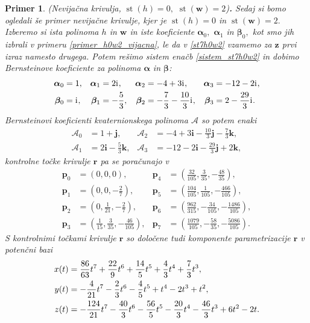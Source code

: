\documentclass[12pt,a4paper,twoside]{article}
\newcommand{\iu}{\mathrm{i}\mkern1mu} %
\theoremstyle{definition} %
\theoremstyle{plain} %
\theoremstyle{primerstyle}
\newtheorem{primer}[definicija]{Primer}
\numberwithin{equation}{section}  %
\newcommand{\pV}{\mathbf{p}}
\newcommand{\rV}{\mathbf{r}}
\newcommand{\iV}{\mathbf{i}}
\newcommand{\jV}{\mathbf{j}}
\newcommand{\kV}{\mathbf{k}}
\newcommand{\wV}{\mathbf{w}}
\newcommand{\zV}{\mathbf{z}}
\newcommand{\AQ}{\mathcal{A}}
\newcommand{\balpha}{\boldsymbol \alpha}
\newcommand{\bbeta}{\boldsymbol \beta}
\DeclareMathOperator{\st}{st}
\begin{document}
\begin{primer}
	\label{primer_h0w2_nevijacna}
	\textnormal{ }(Nevijačna krivulja, $\st(h)=0,$ $\st(\wV)=2$)\textbf{.}
	Sedaj si bomo ogledali še primer nevijačne krivulje, kjer je $\st(h)=0$ in $\st(\wV)=2.$ Izberemo si ista polinoma $h$ in $\wV$ in iste koeficiente $\balpha_0,$ $\balpha_1$ in $\bbeta_0,$ kot smo jih izbrali v primeru \ref{primer_h0w2_vijacna}, le da v \eqref{st7h0w2} vzamemo za $\zV$ prvi izraz namesto drugega. Potem rešimo sistem enačb \eqref{sistem_st7h0w2} in dobimo Bernsteinove koeficiente za polinoma $\balpha$ in $\bbeta$:
	\begin{align*}
		\balpha_0&=1,&\balpha_1&=2\iu,&\balpha_2&=-4+3\iu,&\balpha_3&=-12-2\iu,\\
		\bbeta_0&=\iu,&\bbeta_1&=-\frac{5}{3},&\bbeta_2&=-\frac{7}{3}-\frac{10}{3}\iu,&\bbeta_3&=2-\frac{29}{3}\iu.
	\end{align*}
	Bernsteinovi koeficienti kvaternionskega polinoma $\AQ$ so potem enaki
	\begin{align*}
		\AQ_0&=1+\jV,&\AQ_2&=-4+3\iV-\frac{10}{3}\jV-\frac{7}{3}\kV,\\
		\AQ_1&=2\iV-\frac{5}{3}\kV,&\AQ_3&=-12-2\iV-\frac{29}{3}\jV+2\kV,
	\end{align*}
	kontrolne točke krivulje $\rV$ pa se poračunajo v
	\begin{align*}
		\pV_0&=(0,0,0),&\pV_4&=\left(\frac{32}{105},\frac{3}{35},-\frac{48}{35}\right)\!,\\
		\pV_1&=\left(0,0,-\frac{2}{7}\right)\!,&\pV_5&=\left(\frac{104}{105},\frac{1}{105},-\frac{466}{105}\right)\!,\\
		\pV_2&=\left(0,\frac{1}{21},-\frac{2}{7}\right)\!,&\pV_6&=\left(\frac{962}{315},-\frac{34}{105},-\frac{1486}{105}\right)\!,\\
		\pV_3&=\left(\frac{1}{15},\frac{3}{35},-\frac{46}{105}\right)\!,&\pV_7&=\left(\frac{1079}{105},-\frac{58}{35},-\frac{5086}{105}\right)\!.
	\end{align*}
	S kontrolnimi točkami krivulje $\rV$ so določene tudi komponente parametrizacije $\rV$ v potenčni bazi
	\begin{align}
		x(t)&=\frac{86}{63}t^7+\frac{22}{9}t^6+\frac{14}{5}t^5+\frac{4}{3}t^4+\frac{7}{3}t^3,\notag\\
		y(t)&=-\frac{4}{21}t^7-\frac{2}{3}t^6-\frac{4}{5}t^5+t^4-2t^3+t^2,\label{primer_h0w2_nevijacna_krivulja}\\
		z(t)&=-\frac{124}{21}t^7-\frac{40}{3}t^6-\frac{56}{5}t^5-\frac{20}{3}t^4-\frac{46}{3}t^3+6t^2-2t.\notag
	\end{align}

\end{primer}
\end{document}
